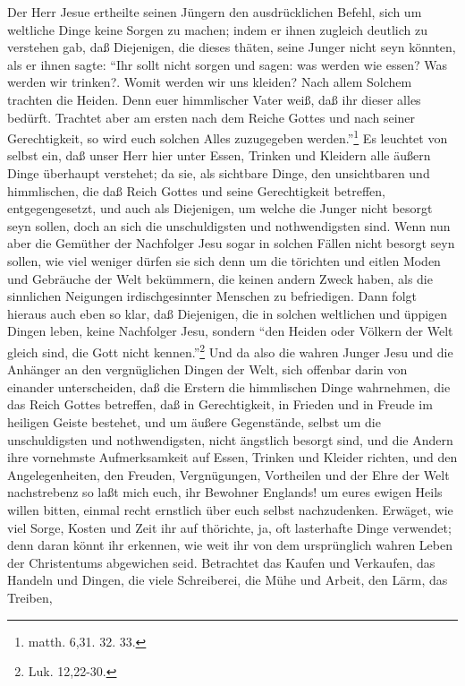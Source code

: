 Der Herr Jesue ertheilte seinen Jüngern den ausdrücklichen Befehl, sich um
weltliche Dinge keine Sorgen zu machen; indem er ihnen zugleich deutlich zu
verstehen gab, daß Diejenigen, die dieses thäten, seine Junger nicht seyn
könnten, als er ihnen sagte: "`Ihr sollt nicht sorgen und sagen: was werden wie
essen? Was werden wir trinken?. Womit werden wir uns kleiden? Nach allem Solchem
trachten die Heiden. Denn euer himmlischer Vater weiß, daß ihr dieser alles
bedürft. Trachtet aber am ersten nach dem Reiche Gottes und nach seiner
Gerechtigkeit, so wird euch solchen Alles zuzugegeben werden."'\footnote{matth.
6,31. 32. 33.} Es leuchtet von selbst ein, daß unser Herr hier unter Essen,
Trinken und Kleidern alle äußern Dinge überhaupt verstehet; da sie, als
sichtbare Dinge, den unsichtbaren und himmlischen, die daß Reich Gottes und
seine Gerechtigkeit betreffen, entgegengesetzt, und auch als Diejenigen, um
welche die Junger nicht besorgt seyn sollen, doch an sich die unschuldigsten und
nothwendigsten sind. Wenn nun aber die Gemüther der Nachfolger Jesu sogar in
solchen Fällen nicht besorgt seyn sollen, wie viel weniger dürfen sie sich denn
um die törichten und eitlen Moden und Gebräuche der Welt bekümmern, die keinen
andern Zweck haben, als die sinnlichen Neigungen irdischgesinnter Menschen zu
befriedigen. Dann folgt hieraus auch eben so klar, daß Diejenigen, die in
solchen weltlichen und üppigen Dingen leben, keine Nachfolger Jesu, sondern
"`den Heiden oder Völkern der Welt gleich sind, die Gott nicht
kennen."'\footnote{Luk. 12,22-30.} Und da also die wahren Junger Jesu und die
Anhänger an den vergnüglichen Dingen der Welt, sich offenbar darin von einander
unterscheiden, daß die Erstern die himmlischen Dinge wahrnehmen, die das Reich
Gottes betreffen, daß in Gerechtigkeit, in Frieden und in Freude im heiligen
Geiste bestehet, und um äußere Gegenstände, selbst um die unschuldigsten und
nothwendigsten, nicht ängstlich besorgt sind, und die Andern ihre vornehmste
Aufmerksamkeit auf Essen, Trinken und Kleider richten, und den Angelegenheiten,
den Freuden, Vergnügungen, Vortheilen und der Ehre der Welt nachstrebenz so laßt
mich euch, ihr Bewohner Englands! um eures ewigen Heils willen bitten, einmal
recht ernstlich über euch selbst nachzudenken. Erwäget, wie viel Sorge, Kosten
und Zeit ihr auf thörichte, ja, oft lasterhafte Dinge verwendet; denn daran
könnt ihr erkennen, wie weit ihr von dem ursprünglich wahren Leben der
Christentums abgewichen seid. Betrachtet das Kaufen und Verkaufen, das Handeln
und Dingen, die viele Schreiberei, die Mühe und Arbeit, den Lärm, das Treiben,
